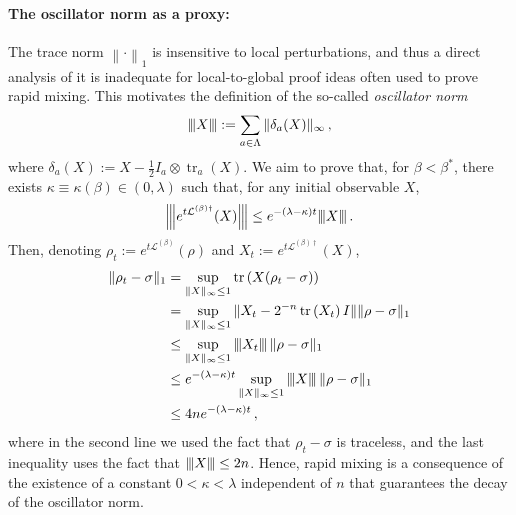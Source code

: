 \documentclass[aps,pra,amsmath,amssymb,twocolumn,10pt]{revtex4-2}
\newcommand{\vertiii}[1]{{\left\vert\kern-0.25ex\left\vert\kern-0.25ex\left\vert #1 
    \right\vert\kern-0.25ex\right\vert\kern-0.25ex\right\vert}}
\theoremstyle{definition}
\def\lb{\left(}
\def\rb{\right)}
\newcommand{\tr}[1]{\operatorname{tr}\lb#1\rb}
\newcommand{\norm}[1]{\left\|#1\right\|}
\begin{document}
\paragraph{The oscillator norm as a proxy:} The trace norm $\norm{\cdot}_1$ is insensitive to local perturbations, and thus a direct analysis of it is inadequate for local-to-global proof ideas often used to prove rapid mixing. This motivates the definition of the so-called \emph{oscillator norm}
\begin{align*}
\vertiii{X}:=\sum_{a\in\Lambda}\|\delta_a(X)\|_\infty\,,
\end{align*}
where $\delta_a(X):=X-\frac{1}{2}I_a\otimes \operatorname{tr}_a(X)$. We aim to prove that, for $\beta< \beta^*$, there exists $\kappa\equiv \kappa(\beta)\in(0,\lambda)$ such that, for any initial observable $X$,
\begin{align}\label{gradientest}
\vertiii{e^{t\mathcal{L}^{(\beta)\dagger}}(X)}\le e^{-(\lambda-\kappa)t}\vertiii{X}\,.
\end{align}
Then, denoting $\rho_t:=e^{t\mathcal{L}^{(\beta)}}(\rho)$ and $X_t:=e^{t\mathcal{L}^{(\beta)\dagger}}(X)$,
\begin{align*}
\|\rho_t-\sigma\|_1&=\sup_{\|X\|_\infty\le 1}\tr{X(\rho_t-\sigma)}\\
&=\sup_{\|X\|_\infty\le 1}\|X_t-2^{-n}\tr{X_t}I\|\|\rho-\sigma\|_1\\
&\le \sup_{\|X\|_\infty\le 1} \vertiii{X_t}\,\|\rho-\sigma\|_1 \\
&\le e^{-(\lambda-\kappa)t}\sup_{\|X\|_\infty\le 1}\vertiii{X}\,\|\rho-\sigma\|_1\\
&\le 4n e^{-(\lambda-\kappa)t}\,,
\end{align*}
where in the second line we used the fact that $\rho_t - \sigma$ is traceless, and the last inequality uses the fact that $\vertiii{X}\le 2n$. Hence, rapid mixing is a consequence of the existence of a constant $0<\kappa<\lambda$ independent of $n$ that guarantees the decay of the oscillator norm. 

\medskip
\end{document}
